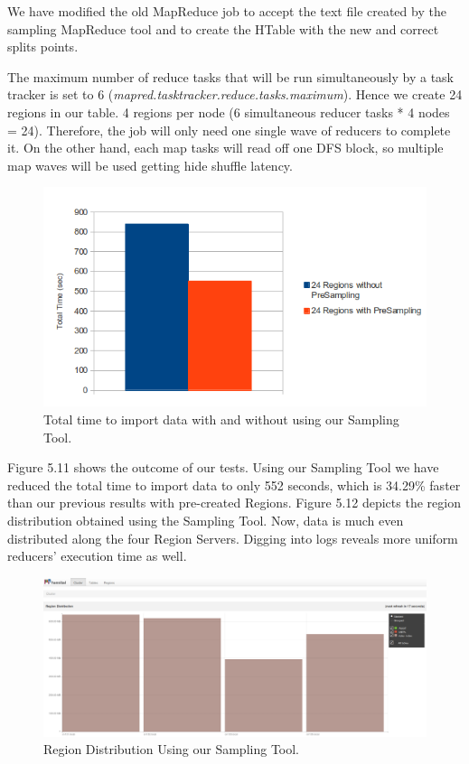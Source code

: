 We have modified the old MapReduce job to accept the text file created by the sampling MapReduce tool and to create the HTable with the new and correct splits points.
\par
The maximum number of reduce tasks that will be run simultaneously by a task tracker is set to 6 (\textit{mapred.tasktracker.reduce.tasks.maximum}). Hence we create 24 regions in our table. 4 regions per node (6 simultaneous reducer tasks {*} 4 nodes = 24). Therefore, the job will only need one single wave of reducers to complete it. On the other hand, each map tasks will read off one DFS block, so multiple map waves will be used getting hide shuffle latency.


\begin{figure}[htb]
\centering
\includegraphics[width=1\textwidth]{./images/24regionsChartSampling.png}
\caption{Total time to import data with and without using our Sampling Tool.} \label{fig:regionDistribution3}
\end{figure}

Figure 5.11 shows the outcome of our tests. Using our Sampling Tool we have reduced the total time to import data to only 552 seconds, which is 34.29\% faster than our previous results with pre-created Regions. Figure 5.12 depicts the region distribution obtained using the Sampling Tool. Now, data is much even distributed along the four Region Servers. Digging into logs reveals more uniform reducers' execution time as well.


\begin{figure}[htb]
\centering
\includegraphics[width=1\textwidth]{./images/usingSampling.png}
\caption{Region Distribution Using our Sampling Tool.} \label{fig:regionDistribution2}
\end{figure}


